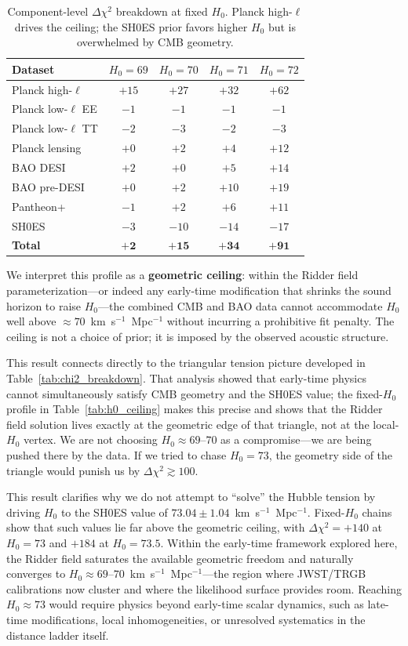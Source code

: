\documentclass[a4paper,11pt]{article}
\begin{document}
\begin{table}[ht]
\centering
\caption{Component-level $\Delta\chi^2$ breakdown at fixed $H_0$. Planck high-$\ell$ drives the ceiling; the SH0ES prior favors higher $H_0$ but is overwhelmed by CMB geometry.}
\label{tab:ceiling_breakdown}
\begin{tabular}{lcccc}
\toprule
Dataset & $H_0=69$ & $H_0=70$ & $H_0=71$ & $H_0=72$ \\
\midrule
Planck high-$\ell$ & $+15$ & $+27$ & $+32$ & $+62$ \\
Planck low-$\ell$ EE & $-1$ & $-1$ & $-1$ & $-1$ \\
Planck low-$\ell$ TT & $-2$ & $-3$ & $-2$ & $-3$ \\
Planck lensing & $+0$ & $+2$ & $+4$ & $+12$ \\
BAO DESI & $+2$ & $+0$ & $+5$ & $+14$ \\
BAO pre-DESI & $+0$ & $+2$ & $+10$ & $+19$ \\
Pantheon+ & $-1$ & $+2$ & $+6$ & $+11$ \\
SH0ES & $-3$ & $-10$ & $-14$ & $-17$ \\
\midrule
\textbf{Total} & $\mathbf{+2}$ & $\mathbf{+15}$ & $\mathbf{+34}$ & $\mathbf{+91}$ \\
\bottomrule
\end{tabular}
\end{table}

We interpret this profile as a \textbf{geometric ceiling}: within the Ridder field parameterization---or indeed any early-time modification that shrinks the sound horizon to raise $H_0$---the combined CMB and BAO data cannot accommodate $H_0$ well above $\approx 70$~km~s$^{-1}$~Mpc$^{-1}$ without incurring a prohibitive fit penalty. The ceiling is not a choice of prior; it is imposed by the observed acoustic structure.

This result connects directly to the triangular tension picture developed in Table~\ref{tab:chi2_breakdown}. That analysis showed that early-time physics cannot simultaneously satisfy CMB geometry and the SH0ES value; the fixed-$H_0$ profile in Table~\ref{tab:h0_ceiling} makes this precise and shows that the Ridder field solution lives exactly at the geometric edge of that triangle, not at the local-$H_0$ vertex. We are not choosing $H_0 \approx 69$--$70$ as a compromise---we are being pushed there by the data. If we tried to chase $H_0 = 73$, the geometry side of the triangle would punish us by $\Delta\chi^2 \gtrsim 100$.

This result clarifies why we do not attempt to ``solve'' the Hubble tension by driving $H_0$ to the SH0ES value of $73.04 \pm 1.04$~km~s$^{-1}$~Mpc$^{-1}$. Fixed-$H_0$ chains show that such values lie far above the geometric ceiling, with $\Delta\chi^2 = +140$ at $H_0 = 73$ and $+184$ at $H_0 = 73.5$. Within the early-time framework explored here, the Ridder field saturates the available geometric freedom and naturally converges to $H_0 \approx 69$--$70$~km~s$^{-1}$~Mpc$^{-1}$---the region where JWST/TRGB calibrations now cluster and where the likelihood surface provides room. Reaching $H_0 \approx 73$ would require physics beyond early-time scalar dynamics, such as late-time modifications, local inhomogeneities, or unresolved systematics in the distance ladder itself.
\end{document}
